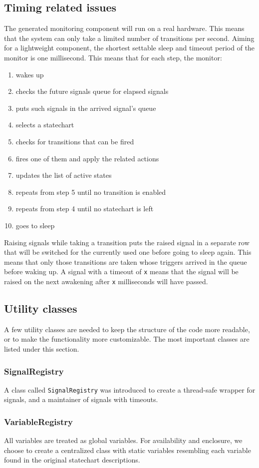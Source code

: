 {  \subsection{Timing related issues}
The generated monitoring component will run on a real hardware. This means that the system can only take a limited number of transitions per second. Aiming for a lightweight component, the shortest settable sleep and timeout period of the monitor is one millisecond. This means that for each step, the monitor:
\begin{enumerate}
  \item wakes up
  \item checks the future signals queue for elapsed signals
  \item puts such signals in the arrived signal's queue
  \item selects a statechart
  \item checks for transitions that can be fired
  \item fires one of them and apply the related actions
  \item updates the list of active states
  \item repeats from step 5 until no transition is enabled
  \item repeats from step 4 until no statechart is left
  \item goes to sleep
\end{enumerate}
Raising signals while taking a transition puts the raised signal in a separate row that will be switched for the currently used one before going to sleep again. This means that only those transitions are taken whose triggers arrived in the queue before waking up. A signal with a timeout of \verb!x! means that the signal will be raised on the next awakening after \verb!x! milliseconds will have passed.
  \subsection{Utility classes}
A few utility classes are needed to keep the structure of the code more readable, or to make the functionality more customizable. The most important classes are listed under this section.
    \subsubsection{SignalRegistry}
A class called \verb!SignalRegistry! was introduced to create a thread-safe wrapper for signals, and a maintainer of signals with timeouts.
    \subsubsection{VariableRegistry}
All variables are treated as global variables. For availability and enclosure, we choose to create a centralized class with static variables resembling each variable found in the original statechart descriptions.
}
